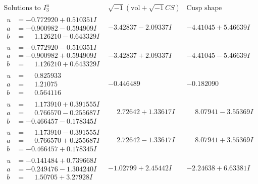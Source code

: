 \documentclass[1p]{elsarticle_modified}
\theoremstyle{definition}
\newcommand{\I}{\sqrt{-1}}
\begin{document}
$$\begin{array}{c|c|c}  
\text{Solutions to }I^u_{3}& \I (\text{vol} + \sqrt{-1}CS) & \text{Cusp shape}\\
 \hline 
\begin{aligned}
u &= -0.772920 + 0.510351 I \\
a &= -0.900982 - 0.594909 I \\
b &= \phantom{-}1.126210 - 0.643329 I\end{aligned}
 & -3.42837 - 2.09337 I & -4.41045 + 5.46639 I \\ \hline\begin{aligned}
u &= -0.772920 - 0.510351 I \\
a &= -0.900982 + 0.594909 I \\
b &= \phantom{-}1.126210 + 0.643329 I\end{aligned}
 & -3.42837 + 2.09337 I & -4.41045 - 5.46639 I \\ \hline\begin{aligned}
u &= \phantom{-}0.825933\phantom{ +0.000000I} \\
a &= \phantom{-}1.21075\phantom{ +0.000000I} \\
b &= \phantom{-}0.564116\phantom{ +0.000000I}\end{aligned}
 & -0.446489\phantom{ +0.000000I} & -0.182090\phantom{ +0.000000I} \\ \hline\begin{aligned}
u &= \phantom{-}1.173910 + 0.391555 I \\
a &= \phantom{-}0.766570 - 0.255687 I \\
b &= -0.466457 - 0.178345 I\end{aligned}
 & \phantom{-}2.72642 + 1.33617 I & \phantom{-}8.07941 - 3.55369 I \\ \hline\begin{aligned}
u &= \phantom{-}1.173910 - 0.391555 I \\
a &= \phantom{-}0.766570 + 0.255687 I \\
b &= -0.466457 + 0.178345 I\end{aligned}
 & \phantom{-}2.72642 - 1.33617 I & \phantom{-}8.07941 + 3.55369 I \\ \hline\begin{aligned}
u &= -0.141484 + 0.739668 I \\
a &= -0.249476 - 1.304240 I \\
b &= \phantom{-}1.50705 + 3.27928 I\end{aligned}
 & -1.02799 + 2.45442 I & -2.24638 + 6.63381 I \\ \hline\begin{aligned}

\end{aligned}
\end{array}$$
\end{document}
